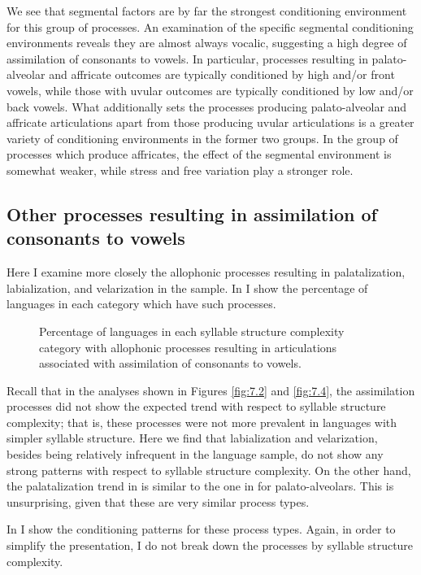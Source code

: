   We see that segmental factors are by far the strongest conditioning environment for this group of processes. An examination of the specific segmental conditioning environments reveals they are almost always vocalic, suggesting a high degree of assimilation of consonants to vowels.  In particular, processes resulting in palato-alveolar and affricate outcomes are typically conditioned by high and/or front vowels, while those with uvular outcomes are typically conditioned by low and/or back vowels. What additionally sets the processes producing palato-alveolar and affricate articulations apart from those producing uvular articulations is a greater variety of conditioning environments in the former two groups. In the group of processes which produce affricates, the effect of the segmental environment is somewhat weaker, while stress and free variation play a stronger role.

\subsection{Other processes resulting in assimilation of consonants to vowels}\label{sec:7.3.3}

  Here I examine more closely the allophonic processes resulting in palatalization, labialization, and velarization in the sample. In  I show the percentage of languages in each category which have such processes.

\begin{figure}
\caption{\label{fig:7.7} Percentage of languages in each syllable structure complexity category with allophonic processes resulting in articulations associated with assimilation of consonants to vowels.}
\end{figure}
  Recall that in the analyses shown in Figures \ref{fig:7.2} and \ref{fig:7.4}, the assimilation processes did not show the expected trend with respect to syllable structure complexity; that is, these processes were not more prevalent in languages with simpler syllable structure. Here we find that labialization and velarization, besides being relatively infrequent in the language sample, do not show any strong patterns with respect to syllable structure complexity. On the other hand, the palatalization trend in  is similar to the one in  for palato-alveolars. This is unsurprising, given that these are very similar process types.

  In  I show the conditioning patterns for these process types. Again, in order to simplify the presentation, I do not break down the processes by syllable structure complexity.

